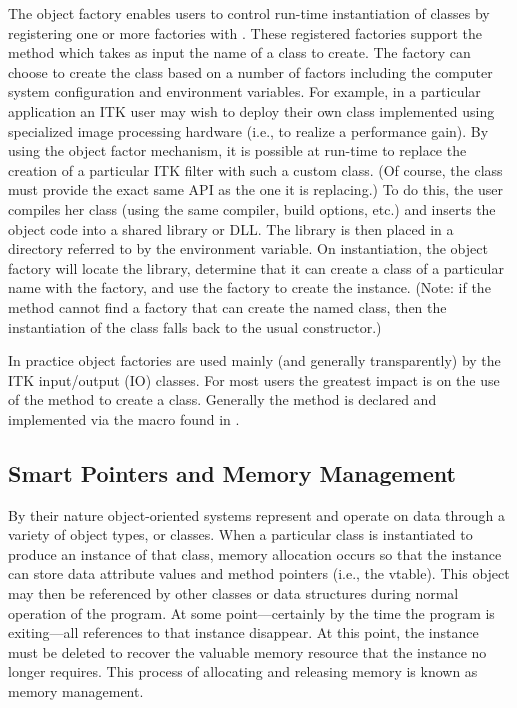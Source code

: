 The object factory enables users to control run-time instantiation of classes
by registering one or more factories with . These
registered factories support the method 
which takes as input the name of a class to create. The factory can choose to
create the class based on a number of factors including the computer system
configuration and environment variables. For example, in a particular
application an ITK user may wish to deploy their own class implemented using
specialized image processing hardware (i.e., to realize a performance
gain). By using the object factor mechanism, it is possible at run-time to
replace the creation of a particular ITK filter with such a custom class. (Of
course, the class must provide the exact same API as the one it is
replacing.) To do this, the user compiles her class (using the same compiler,
build options, etc.) and inserts the object code into a shared library or
DLL. The library is then placed in a directory referred to by the
 environment variable. On instantiation, the object
factory will locate the library, determine that it can create a class of a
particular name with the factory, and use the factory to create the
instance. (Note: if the  method cannot find a factory
that can create the named class, then the instantiation of the class falls
back to the usual constructor.)

In practice object factories are used mainly (and generally transparently) by
the ITK input/output (IO) classes. For most users the greatest impact is on
the use of the  method to create a class. Generally the
 method is declared and implemented via the macro
 found in .


\subsection{Smart Pointers and Memory Management}
\label{sec:SmartPointers}

By their nature object-oriented systems represent and operate on data through
a variety of object types, or classes. When a particular class is
instantiated to produce an instance of that class, memory allocation occurs
so that the instance can store data attribute values and method pointers
(i.e., the vtable). This object may then be referenced by other classes or
data structures during normal operation of the program. At some
point---certainly by the time the program is exiting---all references to that
instance disappear. At this point, the instance must be deleted to recover
the valuable memory resource that the instance no longer requires. This process
of allocating and releasing memory is known as memory management.

